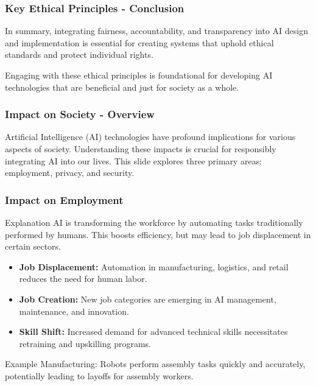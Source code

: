 \documentclass[aspectratio=169]{beamer}
\begin{document}
\begin{frame}[fragile]
  \frametitle{Key Ethical Principles - Conclusion}
  In summary, integrating fairness, accountability, and transparency into AI design and implementation is essential for creating systems that uphold ethical standards and protect individual rights. 

  Engaging with these ethical principles is foundational for developing AI technologies that are beneficial and just for society as a whole.
\end{frame}

\begin{frame}[fragile]
    \frametitle{Impact on Society - Overview}
    Artificial Intelligence (AI) technologies have profound implications for various aspects of society. 
    Understanding these impacts is crucial for responsibly integrating AI into our lives. 
    This slide explores three primary areas: employment, privacy, and security.
\end{frame}

\begin{frame}[fragile]
    \frametitle{Impact on Employment}
    \begin{block}{Explanation}
        AI is transforming the workforce by automating tasks traditionally performed by humans. 
        This boosts efficiency, but may lead to job displacement in certain sectors.
    \end{block}
    
    \begin{itemize}
        \item \textbf{Job Displacement:} Automation in manufacturing, logistics, and retail reduces the need for human labor.
        \item \textbf{Job Creation:} New job categories are emerging in AI management, maintenance, and innovation.
        \item \textbf{Skill Shift:} Increased demand for advanced technical skills necessitates retraining and upskilling programs.
    \end{itemize}
    
    \begin{block}{Example}
        Manufacturing: Robots perform assembly tasks quickly and accurately, potentially leading to layoffs for assembly workers.
    \end{block}
\end{frame}
\end{document}
